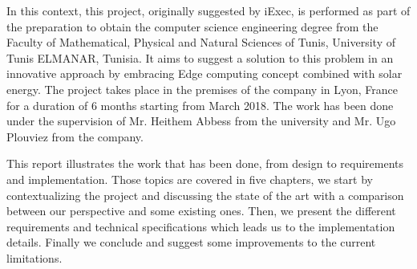 In this context, this project, originally suggested by iExec, is performed as part of the
preparation to obtain the computer science engineering degree from the Faculty of Mathematical,
Physical and Natural Sciences of Tunis, University of Tunis ELMANAR, Tunisia. It aims to suggest a
solution to this problem in an innovative approach by embracing Edge computing concept combined
with solar energy. The project takes place in the premises of the company in Lyon, France for a
duration of 6 months starting from March 2018. The work has been done under the supervision of
Mr. Heithem Abbess from the university and Mr. Ugo Plouviez from the company.

This report
illustrates the work that has been done, from design to requirements and implementation. Those topics
are covered in five chapters, we start by contextualizing the project and discussing the state of the
art with a comparison between our perspective and some existing ones. Then, we present the different
requirements and technical specifications which leads us to the implementation details. Finally we
conclude and suggest some improvements to the current limitations.
